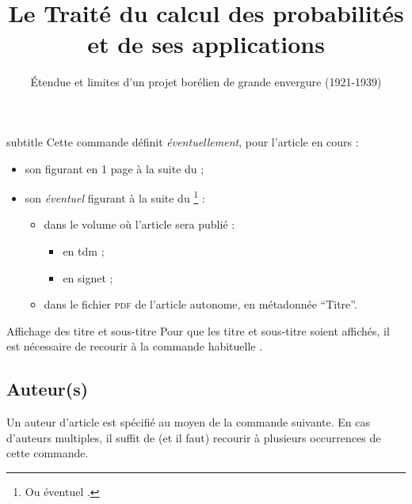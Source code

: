 \documentclass[english,nolocaltoc]{nwejmart}
\newtheorem[style=definition]{fait}
\newtheorem[title=expérience]{experience}
\newtheorem[title-plural=anneaux]{anneau}
\newtheorem[title=idéal,title-plural=idéaux]{ideal}
\begin{document}
\begin{docCommand}{subtitle}{}
  Cette commande définit \emph{éventuellement}, pour l'article en cours :
  \begin{itemize}
  \item son  figurant en 1\iere{} page à la suite
    du  ;
  \item son \emph{éventuel}  figurant à la suite du
    \footnote{Ou éventuel .} :
    \begin{itemize}
    \item dans le volume où l'article sera publié :
      \begin{itemize}
      \item en \gls{tdm} ;
      \item en signet ;
      \end{itemize}
    \item dans le fichier \textsc{pdf} de l'article autonome, en métadonnée
      \enquote{Titre}.
    \end{itemize}
  \end{itemize}
\end{docCommand}

\begin{bodycode}[listing options={deletekeywords={[2]title}}]
\title[Le Traité du calcul des probabilités]{Le Traité du calcul des
  probabilités et de ses applications}
\subtitle[Étendue et limites d'un projet borélien]{Étendue et limites
  d'un projet borélien de grande envergure (1921-1939)}
\end{bodycode}

\begin{dbremark}{Affichage des titre et sous-titre}{}
  Pour que les titre et sous-titre soient affichés, il est nécessaire de
  recourir à la commande habituelle .
\end{dbremark}

\subsection{Auteur(s)}
\label{sec-auteurs}

Un auteur d'article est spécifié au moyen de la commande 
suivante. En cas d'auteurs multiples, il suffit de (et il faut) recourir
à plusieurs occurrences de cette commande.
\end{document}

